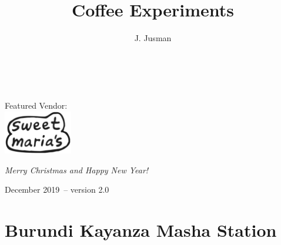 \documentclass[10pt,twoside,footinclude=true,headinclude=true]{scrbook} %
\title{Coffee Experiments}
\author{J. Jusman}
\newcommand\blankpage{
    \clearpage
    \begingroup
      \null
      \thispagestyle{empty}%
      \addtocounter{page}{-1}%
      \hypersetup{pageanchor=false}%
      \clearpage
    \endgroup
}
\begin{document}
\begin{titlepage}
\begin{center}


\vspace*{3cm}
\large{} \\
\bigskip
\Huge{} \\
\vspace{4.5cm}
\normalsize
Featured Vendor: \\
\medskip
\includegraphics[width=3cm]{sweet-marias-homepage-logo.png} \\
\vspace{5cm}

\textit{Merry Christmas and Happy New Year!} \\ \medskip %

December 2019\ -- version 2.0 %

\vfill
\end{center}
\end{titlepage}
    

\blankpage
{}

\tableofcontents 
\let\cleardoublepage=\clearpage %


\linespread{1.3}


\chapter*{Burundi Kayanza Masha Station}
\markboth{}{}
 
\end{document}
